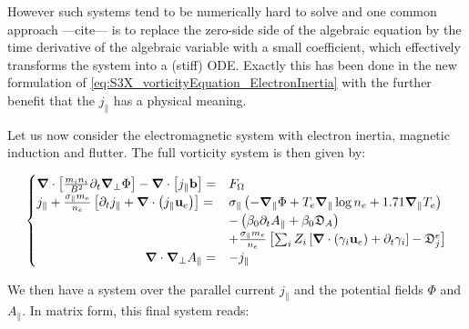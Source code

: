 However such systems tend to be numerically hard to solve and one common approach ---cite--- is to replace the zero-side side of the algebraic equation by the time derivative of the algebraic variable with a small coefficient, which effectively transforms the system into a (stiff) ODE. Exactly this has been done in the new formulation of \autoref{eq:S3X_vorticityEquation_ElectronInertia} with the further benefit that the $j_\parallel$ has a physical meaning.

Let us now consider the electromagnetic system with electron inertia, magnetic induction and flutter. The full vorticity system is then given by: 

\begin{equation}
	\label{eq:S3X_vorticityEquation_FullElectromagnetic}
	\begin{cases}
		\grad\cdot\left[\frac{m_i n_i}{ B^2}\partial_t\grad_\perp\Phi\right] - \grad\cdot\left[j_\parallel\mathbf{b}\right]=& F_\Omega \\
		j_\parallel + \frac{\sigma_\parallel m_e}{n_e}\left[\partial_t j_\parallel + \grad\cdot\left(j_\parallel\mathbf{u}_e\right)\right] =& \sigma_\parallel \left(-\grad_\parallel\Phi + T_e\grad_\parallel\log n_e + 1.71\grad_\parallel T_e\right) \\ 
		& - \left(\beta_0\partial_t A_\parallel + \beta_0\mathfrak{D}_A \right) \\		
		& + \frac{\sigma_\parallel m_e}{n_e}\left[\sum_iZ_i\left[\grad\cdot\left(\gamma_i\mathbf{u}_e \right) + \partial_t \gamma_i\right] - \mathfrak{D}_j^e\right] \\
		\hspace{3cm}\grad\cdot\grad_\perp A_\parallel =& -j_\parallel
	\end{cases}
\end{equation}

 We then have a system over the parallel current $j_\parallel$ and the potential fields $\Phi$ and $A_\parallel$. In matrix form, this final system reads:

